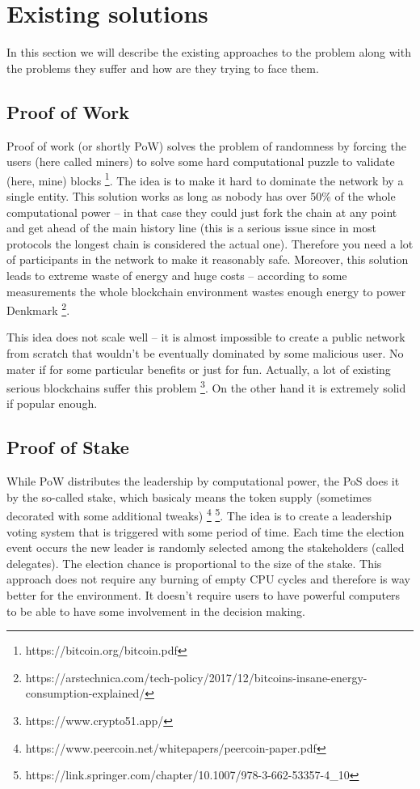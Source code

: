 
\section{Existing solutions}

In this section we will describe the existing approaches to the problem along
with the problems they suffer and how are they trying to face them.

\subsection{Proof of Work}

Proof of work (or shortly PoW) solves the problem of randomness by forcing the
users (here called miners) to solve some hard computational puzzle to validate
(here, mine) blocks \footnote{https://bitcoin.org/bitcoin.pdf}.
The idea is to make it hard to dominate the network by a
single entity. This solution works as long as nobody has over 50\% of the whole
computational power – in that case they could just fork the chain at any point
and get ahead of the main history line (this is a serious issue since in most
protocols the longest chain is considered the actual one). Therefore you need a
lot of participants in the network to make it reasonably safe. Moreover, this
solution leads to extreme waste of energy and huge costs – according to some
measurements the whole blockchain environment wastes enough energy to power
Denkmark
\footnote{https://arstechnica.com/tech-policy/2017/12/bitcoins-insane-energy-consumption-explained/}.

This idea does not scale well – it is almost impossible to create a public
network from scratch that wouldn't be eventually dominated by some malicious
user. No mater if for some particular benefits or just for fun. Actually, a lot
of existing serious blockchains suffer this problem
\footnote{https://www.crypto51.app/}. On the other hand it is extremely solid if
popular enough.

\subsection{Proof of Stake}

While PoW distributes the leadership by computational power, the PoS does it by
the so-called stake, which basicaly means the token supply (sometimes decorated
with some additional tweaks)
\footnote{https://www.peercoin.net/whitepapers/peercoin-paper.pdf}
\footnote{https://link.springer.com/chapter/10.1007/978-3-662-53357-4_10}.
The idea is to create a leadership voting system
that is triggered with some period of time. Each time the election event occurs
the new leader is randomly selected among the stakeholders (called delegates).
The election chance is proportional to the size of the stake. This approach does
not require any burning of empty CPU cycles and therefore is way better for the
environment. It doesn't require users to have powerful computers to be able to
have some involvement in the decision making.

